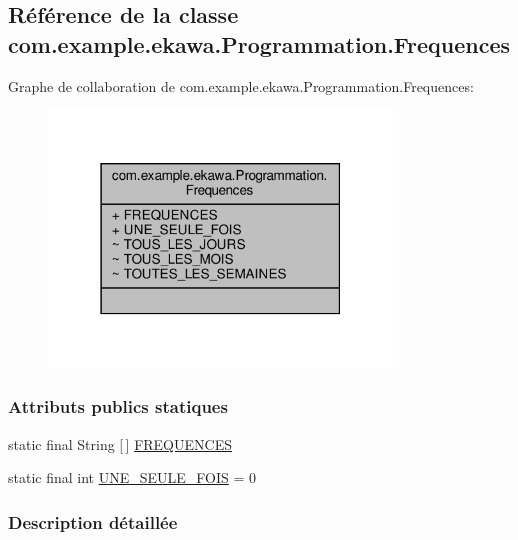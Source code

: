 \hypertarget{classcom_1_1example_1_1ekawa_1_1_programmation_1_1_frequences}{}\subsection{Référence de la classe com.\+example.\+ekawa.\+Programmation.\+Frequences}
\label{classcom_1_1example_1_1ekawa_1_1_programmation_1_1_frequences}


Graphe de collaboration de com.\+example.\+ekawa.\+Programmation.\+Frequences\+:\nopagebreak
\begin{figure}[H]
\begin{center}
\leavevmode
\includegraphics[width=259pt]{classcom_1_1example_1_1ekawa_1_1_programmation_1_1_frequences__coll__graph}
\end{center}
\end{figure}
\subsubsection*{Attributs publics statiques}
\begin{DoxyCompactItemize}
\item 
static final String \mbox{[}$\,$\mbox{]} \hyperlink{classcom_1_1example_1_1ekawa_1_1_programmation_1_1_frequences_afdc0109428ca2cc827cff55b8427cd50}{F\+R\+E\+Q\+U\+E\+N\+C\+ES}
\item 
static final int \hyperlink{classcom_1_1example_1_1ekawa_1_1_programmation_1_1_frequences_a92b76aab3e8479b140194ab329a0f3de}{U\+N\+E\+\_\+\+S\+E\+U\+L\+E\+\_\+\+F\+O\+IS} = 0
\end{DoxyCompactItemize}


\subsubsection{Description détaillée}


